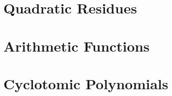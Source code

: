 \section{Quadratic Residues}








\section{Arithmetic Functions}









\section{Cyclotomic Polynomials}

